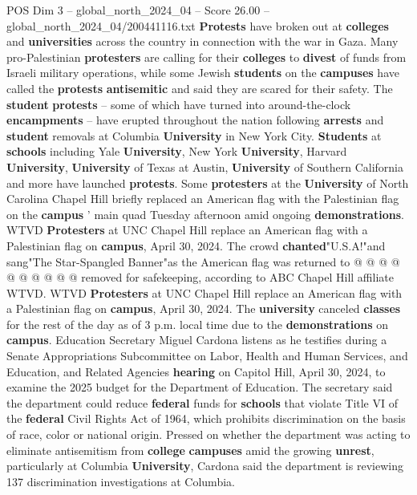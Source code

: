 \begin{textsample}{POS Dim 3 – global\_north\_2024\_04 – Score 26.00 – global\_north\_2024\_04/200441116.txt}  \label{ex:f3_pos_051}
\textbf{Protests} have broken out at \textbf{colleges} and \textbf{universities} across the country in connection with the war in Gaza.
Many pro-Palestinian \textbf{protesters} are calling for their \textbf{colleges} to \textbf{divest} of funds from Israeli military operations, while some Jewish \textbf{students} on the \textbf{campuses} have called the \textbf{protests} \textbf{antisemitic} and said they are scared for their safety.
The \textbf{student} \textbf{protests} -- some of which have turned into around-the-clock \textbf{encampments} -- have erupted throughout the nation following \textbf{arrests} and \textbf{student} removals at Columbia \textbf{University} in New York City. \textbf{Students} at \textbf{schools} including Yale \textbf{University}, New York \textbf{University}, Harvard \textbf{University}, \textbf{University} of Texas at Austin, \textbf{University} of Southern California and more have launched \textbf{protests}.
Some \textbf{protesters} at the \textbf{University} of North Carolina Chapel Hill briefly replaced an American flag with the Palestinian flag on the \textbf{campus} ' main quad Tuesday afternoon amid ongoing \textbf{demonstrations}.
WTVD \textbf{Protesters} at UNC Chapel Hill replace an American flag with a Palestinian flag on \textbf{campus}, April 30, 2024.
The crowd \textbf{chanted}"U.S.A!"and sang"The Star-Spangled Banner"as the American flag was returned to @ @ @ @ @ @ @ @ @ @ removed for safekeeping, according to ABC Chapel Hill affiliate WTVD.
WTVD \textbf{Protesters} at UNC Chapel Hill replace an American flag with a Palestinian flag on \textbf{campus}, April 30, 2024.
The \textbf{university} canceled \textbf{classes} for the rest of the day as of 3 p.m. local time due to the \textbf{demonstrations} on \textbf{campus}.
Education Secretary Miguel Cardona listens as he testifies during a Senate Appropriations Subcommittee on Labor, Health and Human Services, and Education, and Related Agencies \textbf{hearing} on Capitol Hill, April 30, 2024, to examine the 2025 budget for the Department of Education.
The secretary said the department could reduce \textbf{federal} funds for \textbf{schools} that violate Title VI of the \textbf{federal} Civil Rights Act of 1964, which prohibits discrimination on the basis of race, color or national origin.
Pressed on whether the department was acting to eliminate antisemitism from \textbf{college} \textbf{campuses} amid the growing \textbf{unrest}, particularly at Columbia \textbf{University}, Cardona said the department is reviewing 137 discrimination investigations at Columbia.

\end{textsample}
